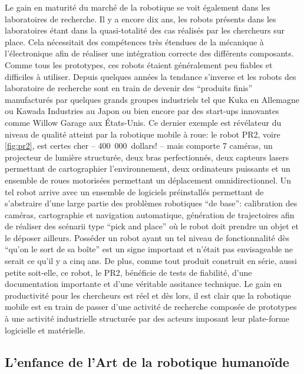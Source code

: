 Le gain en maturité du marché de la robotique se voit également dans
les laboratoires de recherche. Il y a encore dix ans, les robots
présents dans les laboratoires étant dans la quasi-totalité des cas
réalisés par les chercheurs sur place. Cela nécessitait des
compétences très étendues de la mécanique à l'électronique afin de
réaliser une intégration correcte des différents composants. Comme
tous les prototypes, ces robots étaient généralement peu fiables et
difficiles à utiliser. Depuis quelques années la tendance s'inverse et
les robots des laboratoire de recherche sont en train de devenir des
``produits finis'' manufacturés par quelques grands groupes
industriels tel que Kuka en Allemagne ou Kawada Industries au Japon ou
bien encore par des start-ups innovantes comme Willow Garage aux
États-Unis. Ce dernier exemple est révélateur du niveau de qualité
atteint par la robotique mobile à roue: le robot PR2, voire
\autoref{fig:pr2}, est certes cher -- 400 000 dollars! -- mais
comporte 7 caméras, un projecteur de lumière structurée, deux bras
perfectionnés, deux capteurs lasers permettant de cartographier
l'environnement, deux ordinateurs puissants et un ensemble de roues
motorisées permettant un déplacement omnidirectionnel. Un tel robot
arrive avec un ensemble de logiciels préinstallés permettant de
s'abstraire d'une large partie des problèmes robotiques ``de base'':
calibration des caméras, cartographie et navigation automatique,
génération de trajectoires afin de réaliser des scénarii type ``pick
and place'' où le robot doit prendre un objet et le déposer
ailleurs. Posséder un robot ayant un tel niveau de fonctionnalité dès
``qu'on le sort de sa boîte'' est un signe important et n'était pas
envisageable ne serait ce qu'il y a cinq ans. De plus, comme tout
produit construit en série, aussi petite soit-elle, ce robot, le
PR2, bénéficie de tests de fiabilité, d'une
documentation importante et d'une véritable assitance technique. Le
gain en productivité pour les chercheurs est réel et dès lors, il est
clair que la robotique mobile est en train de passer d'une activité de
recherche composée de prototypes à une activité industrielle
structurée par des acteurs imposant leur plate-forme logicielle et
matérielle.



\subsection{L'enfance de l'Art de la robotique humanoïde}


